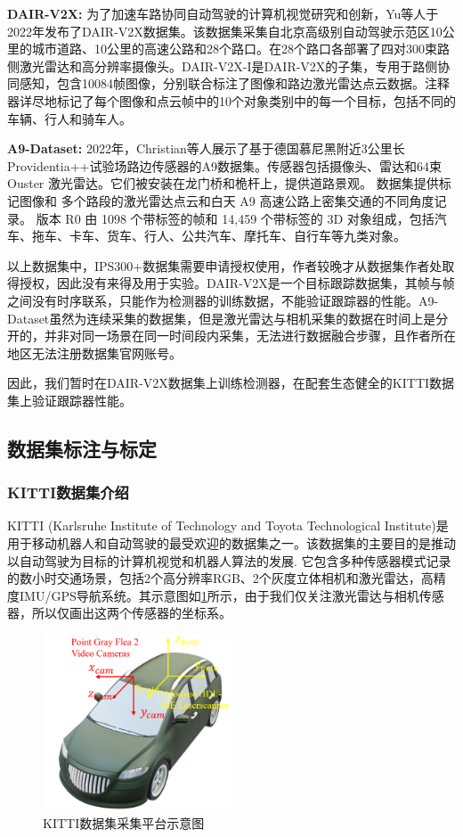 \textbf{DAIR-V2X:} 为了加速车路协同自动驾驶的计算机视觉研究和创新，Yu等人\cite{yu2022dair}于2022年发布了DAIR-V2X数据集。该数据集采集自北京高级别自动驾驶示范区10公里的城市道路、10公里的高速公路和28个路口。在28个路口各部署了四对300束路侧激光雷达和高分辨率摄像头。DAIR-V2X-I是DAIR-V2X的子集，专用于路侧协同感知，包含10084帧图像，分别联合标注了图像和路边激光雷达点云数据。注释器详尽地标记了每个图像和点云帧中的10个对象类别中的每一个目标，包括不同的车辆、行人和骑车人。

\textbf{A9-Dataset:} 2022年，Christian等人\cite{cress2022a9}展示了基于德国慕尼黑附近3公里长Providentia++试验场路边传感器的A9数据集。传感器包括摄像头、雷达和64束Ouster 激光雷达。它们被安装在龙门桥和桅杆上，提供道路景观。 数据集提供标记图像和
多个路段的激光雷达点云和白天 A9 高速公路上密集交通的不同角度记录。 版本 R0 由 1098 个带标签的帧和 14,459 个带标签的 3D 对象组成，包括汽车、拖车、卡车、货车、行人、公共汽车、摩托车、自行车等九类对象。

以上数据集中，IPS300+数据集需要申请授权使用，作者较晚才从数据集作者处取得授权，因此没有来得及用于实验。DAIR-V2X是一个目标跟踪数据集，其帧与帧之间没有时序联系，只能作为检测器的训练数据，不能验证跟踪器的性能。A9-Dataset虽然为连续采集的数据集，但是激光雷达与相机采集的数据在时间上是分开的，并非对同一场景在同一时间段内采集，无法进行数据融合步骤，且作者所在地区无法注册数据集官网账号。

因此，我们暂时在DAIR-V2X数据集上训练检测器，在配套生态健全的KITTI数据集上验证跟踪器性能。

\subsection{数据集标注与标定}

\subsubsection{KITTI数据集介绍}

KITTI\cite{geiger2013vision} (Karlsruhe Institute of Technology and Toyota Technological Institute)是用于移动机器人和自动驾驶的最受欢迎的数据集之一。该数据集的主要目的是推动以自动驾驶为目标的计算机视觉和机器人算法的发展. 它包含多种传感器模式记录的数小时交通场景，包括2个高分辨率RGB、2个灰度立体相机和激光雷达，高精度IMU/GPS导航系统。其示意图如\ref{fig4}所示，由于我们仅关注激光雷达与相机传感器，所以仅画出这两个传感器的坐标系。

\begin{figure}[htb] 
    \center
    \includegraphics[width=0.5\textwidth]{figure/fig4.png}
    \caption{KITTI数据集采集平台示意图}
    \label{fig4}
\end{figure}

